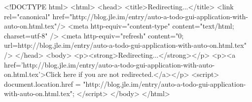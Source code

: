 <!DOCTYPE html>
<html>
<head>
<title>Redirecting...</title>
<link rel="canonical" href="http://blog.jle.im/entry/auto-a-todo-gui-application-with-auto-on.html.tex"/>
<meta http-equiv="content-type" content="text/html; charset=utf-8" />
<meta http-equiv="refresh" content="0; url=http://blog.jle.im/entry/auto-a-todo-gui-application-with-auto-on.html.tex" />
</head>
<body>
  <p><strong>Redirecting...</strong></p>
  <p><a href='http://blog.jle.im/entry/auto-a-todo-gui-application-with-auto-on.html.tex'>Click here if you are not redirected.</a></p>
  <script>
    document.location.href = "http://blog.jle.im/entry/auto-a-todo-gui-application-with-auto-on.html.tex";
  </script>
</body>
</html>
